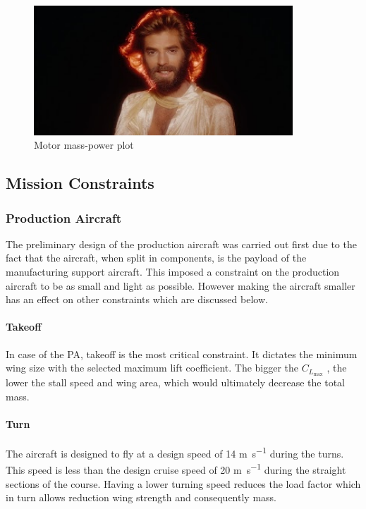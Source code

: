 \begin{figure}[H]
    \centering
    \includegraphics[width=9.72cm]{./preliminary_design/fig/dummy}
    \caption{Motor mass-power plot}
    \label{fig:constraint_alg}
\end{figure}


\subsection{Mission Constraints}
\subsubsection{Production Aircraft}
The preliminary design of the production aircraft was carried out first due to the fact that the aircraft, when split in components, is the payload of the manufacturing support aircraft. This imposed a constraint on the production aircraft to be as small and light as possible. However making the aircraft smaller has an effect on other constraints which are discussed below.

\paragraph{Takeoff}
In case of the PA, takeoff is the most critical constraint. It dictates the minimum wing size with the selected maximum lift coefficient. The bigger the $C_{L_\text{max}}$ , the lower the stall speed and wing area, which would ultimately decrease the total mass.

\paragraph{Turn}
The aircraft is designed to fly at a design speed of 14 \si{\meter\per\second} during the turns. This speed is less than the design cruise speed of 20 \si{\meter\per\second} during the straight sections of the course. Having a lower turning speed reduces the load factor which in turn allows reduction wing strength and consequently mass.

